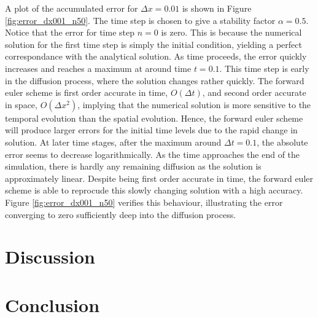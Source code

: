 \documentclass[12pt]{extarticle}
\begin{document}
\par A plot of the accumulated error for $\Delta x=0.01$ is shown in Figure \ref{fig:error_dx001_n50}. The time step is chosen to give a stability factor $\alpha=0.5$. Notice that the error for time step $n=0$ is zero. This is because the numerical solution for the first time step is simply the initial condition, yielding a perfect correspondance with the analytical solution. As time proceeds, the error quickly increases and reaches a maximum at around time $t=0.1$. This time step is early in the diffusion process, where the solution changes rather quickly. The forward euler scheme is first order accurate in time, $O(\Delta t)$, and second order accurate in space, $O(\Delta x^2)$, implying that the numerical solution is more sensitive to the temporal evolution than the spatial evolution. Hence, the forward euler scheme will produce larger errors for the initial time levels due to the rapid change in solution. At later time stages, after the maximum around $\Delta t=0.1$, the absolute error seems to decrease logarithmically. As the time approaches the end of the simulation, there is hardly any remaining diffusion as the solution is approximately linear. Despite being first order accurate in time, the forward euler scheme is able to reprocude this slowly changing solution with a high accuracy. Figure \ref{fig:error_dx001_n50} verifies this behaviour, illustrating the error converging to zero sufficiently deep into the diffusion process.


\section{Discussion}
\section{Conclusion}



\end{document}
